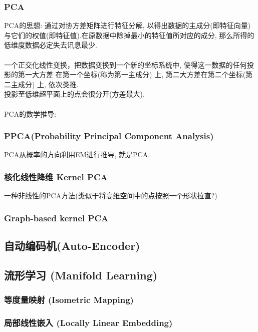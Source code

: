 \documentclass[oneside]{book}
\begin{document}
					\subsubsection{PCA \NovaMonoFont{[Linear]}}
					PCA的思想: 通过对协方差矩阵进行特征分解, 以得出数据的主成分(即特征向量) 与它们的权值(即特征值).在原数据中除掉最小的特征值所对应的成分, 那么所得的低维度数据必定失去讯息最少.\\\\
					一个正交化线性变换，把数据变换到一个新的坐标系统中, 使得这一数据的任何投影的第一大方差
					在第一个坐标(称为第一主成分) 上, 第二大方差在第二个坐标(第二主成分) 上, 依次类推.\\ 
					投影至低维超平面上的点会很分开(方差最大).\\ \\
					PCA的数学推导:\\
					\subsubsection{PPCA(Probability Principal Component Analysis) \NovaMonoFont{[Linear]}}
					PCA从概率的方向利用EM进行推导, 就是PCA. 
					\subsubsection{核化线性降维 Kernel PCA \NovaMonoFont{[Nonlinear]}}
					一种非线性的PCA方法(类似于将高维空间中的点按照一个形状拉直?)
					\subsubsection{Graph-based kernel PCA \NovaMonoFont{[Nonlinear]}}
					
				
				\subsection{自动编码机(Auto-Encoder)}
				\subsection{流形学习 (Manifold Learning) }
					\subsubsection{等度量映射 (Isometric Mapping)  \NovaMonoFont{[Nonlinear]}}
					\subsubsection{局部线性嵌入 (Locally Linear Embedding)  \NovaMonoFont{[Linear]}}
\end{document}
